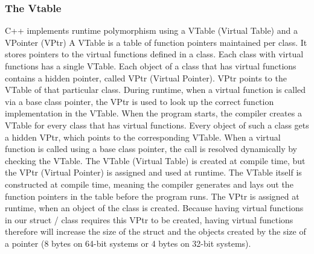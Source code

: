 \documentclass{report}
\begin{document}
    \bigbreak \noindent 
    \subsubsection{The Vtable}
    \bigbreak \noindent 
    C++ implements runtime polymorphism using a VTable (Virtual Table) and a VPointer (VPtr)
    \bigbreak \noindent 
    A VTable is a table of function pointers maintained per class. It stores pointers to the virtual functions defined in a class. Each class with virtual functions has a single VTable.
    \bigbreak \noindent 
    Each object of a class that has virtual functions contains a hidden pointer, called VPtr (Virtual Pointer). VPtr points to the VTable of that particular class.
    \bigbreak \noindent 
    During runtime, when a virtual function is called via a base class pointer, the VPtr is used to look up the correct function implementation in the VTable.
    \bigbreak \noindent
    When the program starts, the compiler creates a VTable for every class that has virtual functions. Every object of such a class gets a hidden VPtr, which points to the corresponding VTable.
    \bigbreak \noindent 
    When a virtual function is called using a base class pointer, the call is resolved dynamically by checking the VTable.
    \bigbreak \noindent 
    The VTable (Virtual Table) is created at compile time, but the VPtr (Virtual Pointer) is assigned and used at runtime.
    \bigbreak \noindent 
    The VTable itself is constructed at compile time, meaning the compiler generates and lays out the function pointers in the table before the program runs.
    \bigbreak \noindent 
    The VPtr is assigned at runtime, when an object of the class is created.
    \bigbreak \noindent 
    Because having virtual functions in our struct / class requires this VPtr to be created, having virtual functions therefore will increase the size of the struct and the objects created by the size of a pointer (8 bytes on 64-bit systems or 4 bytes on 32-bit systems).
\end{document}
